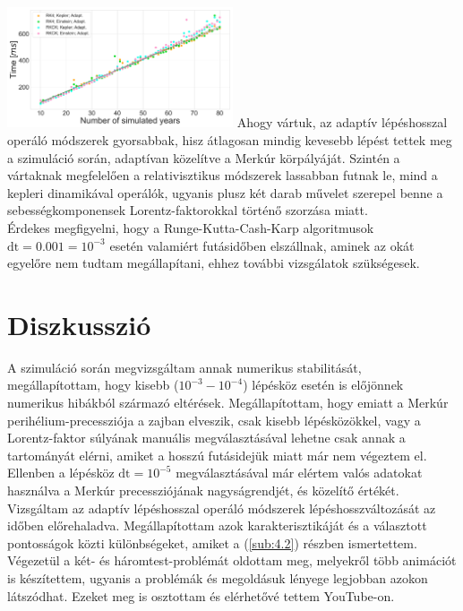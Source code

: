 \begin{multicols}{2}
\hfill \break \break
{\centering\includegraphics[width=0.5\textwidth]{images/single_body/runtime_adaptive_1e-04.pdf}}
\hfill \break \break
Ahogy vártuk, az adaptív lépéshosszal operáló módszerek gyorsabbak, hisz átlagosan mindig kevesebb lépést tettek meg a szimuláció során, adaptívan közelítve a Merkúr körpályáját. Szintén a vártaknak megfelelően a relativisztikus módszerek lassabban futnak le, mind a kepleri dinamikával operálók, ugyanis plusz két darab művelet szerepel benne a sebességkomponensek Lorentz-faktorokkal történő szorzása miatt. \\
Érdekes megfigyelni, hogy a Runge-Kutta-Cash-Karp algoritmusok $\text{dt} = 0.001 = 10^{-3}$ esetén valamiért futásidőben elszállnak, aminek az okát egyelőre nem tudtam megállapítani, ehhez további vizsgálatok szükségesek.

\section{Diszkusszió} \label{sec:5}
A szimuláció során megvizsgáltam annak numerikus stabilitását, megállapítottam, hogy kisebb ($10^{-3}-10^{-4}$) lépésköz esetén is előjönnek numerikus hibákból származó eltérések. Megállapítottam, hogy emiatt a Merkúr perihélium-precessziója a zajban elveszik, csak kisebb lépésközökkel, vagy a Lorentz-faktor súlyának manuális megválasztásával lehetne csak annak a tartományát elérni, amiket a hosszú futásidejük miatt már nem végeztem el. Ellenben a lépésköz $\text{dt}=10^{-5}$ megválasztásával már elértem valós adatokat használva a Merkúr precessziójának nagyságrendjét, és közelítő értékét.\\
Vizsgáltam az adaptív lépéshosszal operáló módszerek lépéshosszváltozását az időben előrehaladva. Megállapítottam azok karakterisztikáját és a választott pontosságok közti különbségeket, amiket a (\ref{sub:4.2}) részben ismertettem.\\
Végezetül a két- és háromtest-problémát oldottam meg, melyekről több animációt is készítettem, ugyanis a problémák és megoldásuk lényege legjobban azokon látszódhat. Ezeket meg is osztottam és elérhetővé tettem YouTube-on\cite{yt}.

\end{multicols}